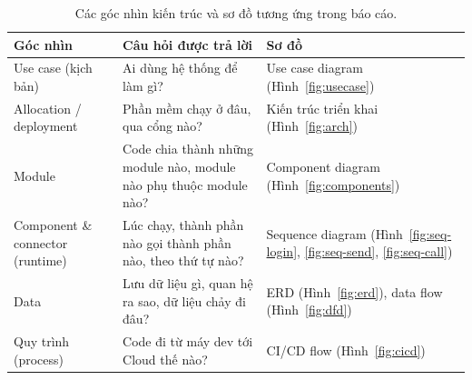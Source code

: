 \documentclass[11pt, a4paper]{article}
\begin{document}
\begin{table}[H]
  \centering
  \small
  \caption{Các góc nhìn kiến trúc và sơ đồ tương ứng trong báo cáo.}
  \label{tab:views}
  \begin{tabularx}{\linewidth}{P{3.4cm}YP{4.2cm}}
    \toprule
    \textbf{Góc nhìn} & \textbf{Câu hỏi được trả lời} & \textbf{Sơ đồ} \\
    \midrule
    Use case (kịch bản) & Ai dùng hệ thống để làm gì? & Use case diagram (Hình~\ref{fig:usecase}) \\
    Allocation / deployment & Phần mềm chạy ở đâu, qua cổng nào? & Kiến trúc triển khai (Hình~\ref{fig:arch}) \\
    Module & Code chia thành những module nào, module nào phụ thuộc module nào? & Component diagram (Hình~\ref{fig:components}) \\
    Component \& connector (runtime) & Lúc chạy, thành phần nào gọi thành phần nào, theo thứ tự nào? & Sequence diagram (Hình~\ref{fig:seq-login}, \ref{fig:seq-send}, \ref{fig:seq-call}) \\
    Data & Lưu dữ liệu gì, quan hệ ra sao, dữ liệu chảy đi đâu? & ERD (Hình~\ref{fig:erd}), data flow (Hình~\ref{fig:dfd}) \\
    Quy trình (process) & Code đi từ máy dev tới Cloud thế nào? & CI/CD flow (Hình~\ref{fig:cicd}) \\
    \bottomrule
  \end{tabularx}
\end{table}
\end{document}
